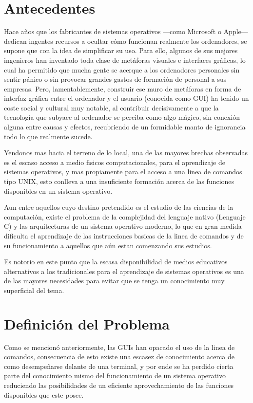 \documentclass[letterpaper,11pt]{article}
\begin{document}
\section{Antecedentes}
Hace años que los fabricantes de sistemas operativos —como Microsoft o Apple—
dedican ingentes recursos a ocultar cómo funcionan realmente los ordenadores,
se supone que con la idea de simplificar su uso. Para ello, algunos de sus
mejores ingenieros han inventado toda clase de metáforas visuales e interfaces
gráficas, lo cual ha permitido que mucha gente se acerque a los ordenadores
personales sin sentir pánico o sin provocar grandes gastos de formación de
personal a sus empresas. Pero, lamentablemente, construir ese muro de
metáforas en forma de interfaz gráfica entre el ordenador y el usuario
(conocida como GUI) ha tenido un coste social y cultural muy notable, al
contribuir decisivamente a que la tecnología que subyace al ordenador se
perciba como algo mágico, sin conexión alguna entre causas y efectos,
recubriendo de un formidable manto de ignorancia todo lo que realmente
sucede.\cite{Stephenson}

Yendonos mas hacia el terreno de lo local, una de las mayores brechas
observadas es el escaso acceso a medio fisicos computacionales, para el
aprendizaje de sistemas operativos, y mas propiamente para el acceso a una
linea de comandos tipo UNIX, esto conlleva a una insuficiente formación acerca
de las funciones disponibles en un sistema operativo.

Aun entre aquellos cuyo destino pretendido es el estudio de las ciencias de la
computación, existe el problema de la complejidad del lenguaje nativo
(Lenguaje C) y las arquitecturas de un sistema operativo moderno, lo que en
gran medida dificulta el aprendizaje de las instrucciones basicas de la linea
de comandos y de su funcionamiento a aquellos que aún estan comenzando sus
estudios.

Es notorio en este punto que la escasa disponibilidad de medios educativos
alternativos a los tradicionales para el aprendizaje de sistemas operativos es
una de las mayores necesidades para evitar que se tenga un conocimiento muy
superficial del tema.

\section{Definición del Problema}
Como se mencionó anteriormente, las GUIs han opacado el uso de la linea de
comandos, consecuencia de esto existe una escasez de conocimiento acerca de
como desempeñarse delante de una terminal, y por ende se ha perdido cierta
parte del conocimiento mismo del funcionamiento de un sistema operativo
reduciendo las posibilidades de un eficiente aprovechamiento de las funciones
disponibles que este posee.
\end{document}
